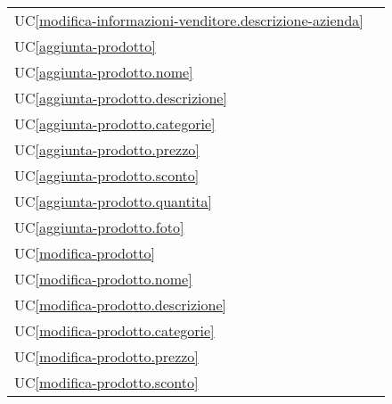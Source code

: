 \begin{longtable}{C{6cm} C{6cm}}
	UC\ref{modifica-informazioni-venditore.descrizione-azienda} &  \\

    UC\ref{aggiunta-prodotto} &  \\

	UC\ref{aggiunta-prodotto.nome} &  \\

    UC\ref{aggiunta-prodotto.descrizione} &  \\

	UC\ref{aggiunta-prodotto.categorie} &  \\

    UC\ref{aggiunta-prodotto.prezzo} &  \\

	UC\ref{aggiunta-prodotto.sconto} &  \\

    UC\ref{aggiunta-prodotto.quantita} &  \\

	UC\ref{aggiunta-prodotto.foto} &  \\

    UC\ref{modifica-prodotto} &  \\

	UC\ref{modifica-prodotto.nome} &  \\

    UC\ref{modifica-prodotto.descrizione} &  \\

	UC\ref{modifica-prodotto.categorie} &  \\

    UC\ref{modifica-prodotto.prezzo} &  \\

	UC\ref{modifica-prodotto.sconto} &  \\


\end{longtable}
